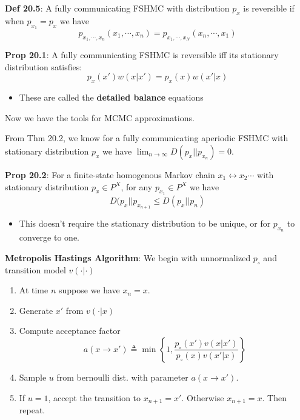 \documentclass[12pt]{article} %
\begin{document}
\textbf{Def 20.5}: A fully communicating FSHMC with distribution $p_x$ is reversible if when $p_{x_1} = p_x$ we have
\begin{equation*}
    p_{x_1,\cdots, x_n}(x_1, \cdots, x_n) = p_{x_1,\cdots, x_N}(x_n, \cdots, x_1)
\end{equation*}


\textbf{Prop 20.1}: A fully communicating FSHMC is reversible iff its stationary distribution satisfies:
\begin{equation*}
    p_x(x') w(x|x') = p_x(x) w(x'|x)
\end{equation*}
\begin{itemize}[topsep=-1pt, itemsep=-1pt]
    \item These are called the \textbf{detailed balance} equations
\end{itemize}

\separate

Now we have the tools for MCMC approximations.

From Thm 20.2, we know for a fully communicating aperiodic FSHMC with stationary distribution $p_x$ we have $\lim_{n\rightarrow \infty} D(p_x||p_{x_n}) = 0$.

\textbf{Prop 20.2}: For a finite-state homogenous Markov chain $x_1 \leftrightarrow x_2 \cdots$ with stationary distribution $p_x \in P^X$, for any $p_{x_1} \in P^X$ we have
\begin{equation*}
    D(p_x || p_{x_{n+1}} \leq D(p_x || p_n)
\end{equation*}
\begin{itemize}[topsep=-1pt, itemsep=-1pt]
    \item This doesn't require the stationary distribution to be unique, or for $p_{x_n}$ to converge to one.
\end{itemize}

\textbf{Metropolis Hastings Algorithm}:
We begin with unnormalized $p_\circ$ and transition model $v(\cdot|\cdot)$
\begin{enumerate}[itemsep=-1pt, topsep=-1pt]
    \item At time $n$ suppose we have $x_n = x$.
    \item Generate $x'$ from $v(\cdot|x)$
    \item Compute acceptance factor
    \begin{equation*}
        a(x \rightarrow x') \triangleq
        \min \left\{
        1,
        \frac{p_\circ(x')v(x|x')}{p_\circ(x) v(x'|x)}
        \right\}
    \end{equation*}
    \item Sample $u$ from bernoulli dist. with parameter $a(x \rightarrow x')$.
    \item If $u = 1$, accept the transition to $x_{n+1} = x'$. Otherwise $x_{n+1} = x$. Then repeat.
\end{enumerate}
\end{document}
